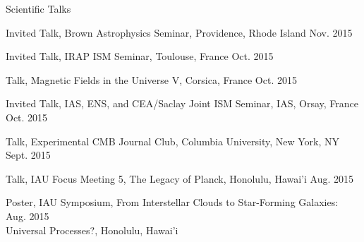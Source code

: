 \documentclass{resume_clark} %
\newcommand{\hi}{H{\sc i}~}
\begin{document}
\begin{rSection}{Scientific Talks}
\begin{etaremune}
\item Invited Talk, Brown Astrophysics Seminar, Providence, Rhode Island \hfill {Nov. 2015}

\item Invited Talk, IRAP ISM Seminar, Toulouse, France \hfill{Oct. 2015}

\item Talk, Magnetic Fields in the Universe V, Corsica, France \hfill {Oct. 2015}

\item Invited Talk, IAS, ENS, and CEA/Saclay Joint ISM Seminar, IAS, Orsay, France \hfill {Oct. 2015}

\item Talk, Experimental CMB Journal Club, Columbia University, New York, NY \hfill {Sept. 2015}

\item Talk, IAU Focus Meeting 5, The Legacy of Planck, Honolulu, Hawai'i \hfill {Aug. 2015}

\item Poster, IAU Symposium, From Interstellar Clouds to Star-Forming Galaxies: \hfill {Aug. 2015}\\Universal Processes?, Honolulu, Hawai'i


\end{etaremune}
\end{rSection}
\end{document}
